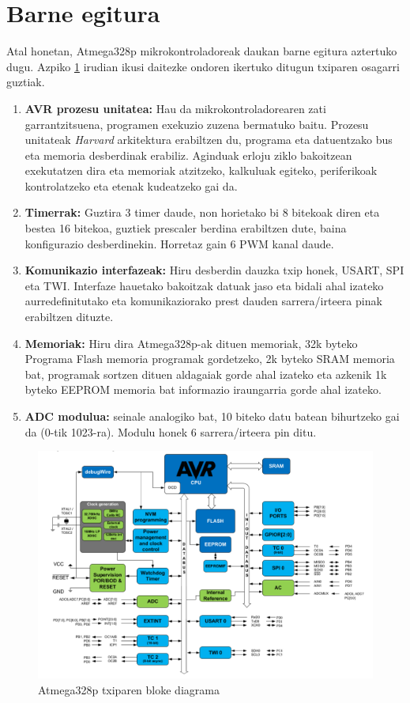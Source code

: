 \section{Barne egitura}
Atal honetan, Atmega328p mikrokontroladoreak daukan barne egitura aztertuko dugu. Azpiko \ref{fig:bloke_diag} irudian ikusi daitezke ondoren ikertuko ditugun txiparen osagarri guztiak.

\begin{enumerate}
    \item \textbf{AVR prozesu unitatea:} Hau da mikrokontroladorearen zati garrantzitsuena, programen exekuzio zuzena bermatuko baitu. Prozesu unitateak \textit{Harvard} arkitektura erabiltzen du, programa eta datuentzako bus eta memoria desberdinak erabiliz. Aginduak erloju ziklo bakoitzean exekutatzen dira eta memoriak atzitzeko, kalkuluak egiteko, periferikoak kontrolatzeko eta etenak kudeatzeko gai da.
    \item \textbf{Timerrak:} Guztira 3 timer daude, non horietako bi 8 bitekoak diren eta bestea 16 bitekoa, guztiek prescaler berdina erabiltzen dute, baina konfigurazio desberdinekin. Horretaz gain 6 PWM kanal daude. %
    \item \textbf{Komunikazio interfazeak:} Hiru desberdin dauzka txip honek, USART, SPI eta TWI. Interfaze hauetako bakoitzak datuak jaso eta bidali ahal izateko aurredefinitutako eta komunikaziorako prest dauden sarrera/irteera pinak erabiltzen dituzte.
    \item \textbf{Memoriak:} Hiru dira Atmega328p-ak dituen memoriak, 32k byteko Programa Flash memoria programak gordetzeko, 2k byteko SRAM memoria bat, programak sortzen dituen aldagaiak gorde ahal izateko eta azkenik 1k byteko EEPROM memoria bat informazio iraungarria gorde ahal izateko.
    \item \textbf{ADC modulua:} seinale analogiko bat, 10 biteko datu batean bihurtzeko gai da (0-tik 1023-ra). Modulu honek 6 sarrera/irteera pin ditu. %
\end{enumerate}
\newpage
\begin{figure}[htb]
	\centering
	\includegraphics[width=.99\linewidth]{images/bloke_diagrama.png}
	\caption{\label{fig:bloke_diag} Atmega328p txiparen bloke diagrama}
\end{figure}


